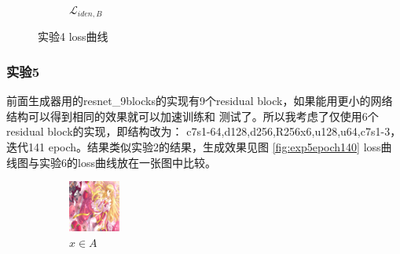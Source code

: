\documentclass[twocolumn,11pt]{ctexart}
\begin{document}
\begin{figure}[htb]
\begin{subfigure}[b]{0.23\linewidth}
        \caption{$\mathcal{L}_{iden,B}$}
      \end{subfigure}
      \caption{实验4 loss曲线}
      \label{fig:exp3loss}
\end{figure}

\subsubsection{实验5}

前面生成器用的resnet\_9blocks的实现有9个residual block，如果能用更小的网络结构可以得到相同的效果就可以加速训练和
测试了。所以我考虑了仅使用6个residual block的实现，即结构改为：
c7s1-64,d128,d256,R256x6,u128,u64,c7s1-3，迭代141 epoch。结果类似实验2的结果，生成效果见图 \ref{fig:exp5epoch140}
loss曲线图与实验6的loss曲线放在一张图中比较。

\begin{figure}[htb]
    \centering
    \begin{subfigure}[b]{0.23\linewidth}
        \includegraphics[width=\linewidth]{exp5_epoch140_real_A.png}
        \caption{$x \in A$}
      \end{subfigure}
      \begin{subfigure}[b]{0.23\linewidth}

\end{subfigure}
\end{figure}
\end{document}
